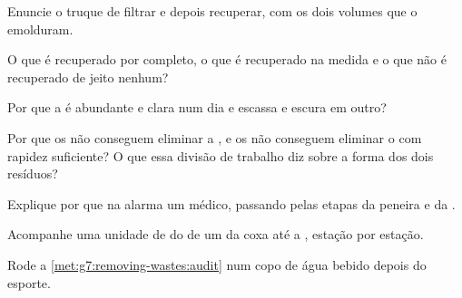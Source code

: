 \begin{exercise}[$\star$]\label{exo:g7:removing-wastes:4}
Enuncie o truque de filtrar e depois recuperar, com os dois volumes
que o emolduram.
\end{exercise}

\begin{exercise}[$\star$]\label{exo:g7:removing-wastes:5}
O que é recuperado por completo, o que é recuperado na medida e o que
não é recuperado de jeito nenhum?
\end{exercise}

\begin{exercise}[$\star$]\label{exo:g7:removing-wastes:6}
Por que a  é abundante e clara num dia e escassa e escura em
outro?
\end{exercise}

\begin{exercise}[$\star\star$]\label{exo:g7:removing-wastes:7}
Por que os  não conseguem eliminar a , e os  não
conseguem eliminar o  com rapidez suficiente? O que essa
divisão de trabalho diz sobre a forma dos dois resíduos?
\end{exercise}

\begin{exercise}[$\star\star$]\label{exo:g7:removing-wastes:8}
Explique por que  na  alarma um médico, passando pelas
etapas da peneira e da .
\end{exercise}

\begin{exercise}[$\star\star$]\label{exo:g7:removing-wastes:9}
Acompanhe uma unidade de  do  de um  da coxa até a
, estação por estação.
\end{exercise}

\begin{exercise}[$\star\star$]\label{exo:g7:removing-wastes:10}
Rode a \cref{met:g7:removing-wastes:audit} num copo de água bebido
depois do esporte.
\end{exercise}

